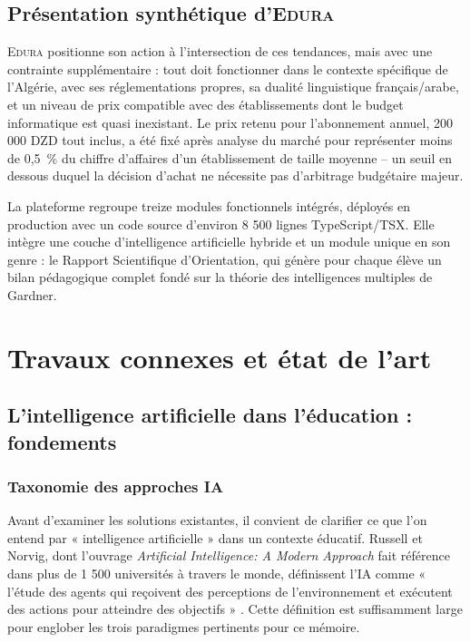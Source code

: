 \documentclass[12pt,a4paper,oneside]{report}
\newcommand{\edura}{\textsc{Edura}}
\begin{document}
\section{Présentation synthétique d'\edura{}}

\edura{} positionne son action à l'intersection de ces tendances, mais avec une contrainte supplémentaire : tout doit fonctionner dans le contexte spécifique de l'Algérie, avec ses réglementations propres, sa dualité linguistique français/arabe, et un niveau de prix compatible avec des établissements dont le budget informatique est quasi inexistant. Le prix retenu pour l'abonnement annuel, 200 000 \ac{DZD} tout inclus, a été fixé après analyse du marché pour représenter moins de 0,5~\% du chiffre d'affaires d'un établissement de taille moyenne -- un seuil en dessous duquel la décision d'achat ne nécessite pas d'arbitrage budgétaire majeur.

La plateforme regroupe treize modules fonctionnels intégrés, déployés en production avec un code source d'environ 8 500 lignes TypeScript/TSX. Elle intègre une couche d'intelligence artificielle hybride et un module unique en son genre : le Rapport Scientifique d'Orientation, qui génère pour chaque élève un bilan pédagogique complet fondé sur la théorie des intelligences multiples de Gardner.

\chapter{Travaux connexes et état de l'art}

\section{L'intelligence artificielle dans l'éducation : fondements}

\subsection{Taxonomie des approches IA}

Avant d'examiner les solutions existantes, il convient de clarifier ce que l'on entend par « intelligence artificielle » dans un contexte éducatif. Russell et Norvig, dont l'ouvrage \textit{Artificial Intelligence: A Modern Approach} fait référence dans plus de 1 500 universités à travers le monde, définissent l'IA comme « l'étude des agents qui reçoivent des perceptions de l'environnement et exécutent des actions pour atteindre des objectifs » \autocite{russell2020artificial}. Cette définition est suffisamment large pour englober les trois paradigmes pertinents pour ce mémoire.
\end{document}
